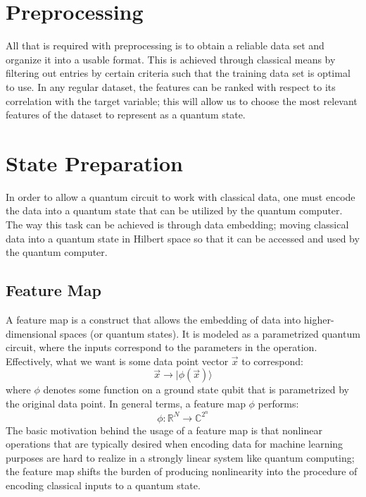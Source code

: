 \documentclass[12pt]{article}
\begin{document}
\section{Preprocessing}
    All that is required with preprocessing is to obtain a reliable data set 
    and organize it into a usable format. This is achieved through classical means by 
    filtering out entries by certain criteria such that the training data set is optimal 
    to use. In any regular dataset, the features can be ranked with respect to its correlation with the target
    variable; this will allow us to choose the most relevant features of the dataset to represent as a quantum state.

\section{State Preparation}
    In order to allow a quantum circuit to work with classical data, one must encode the data into a 
    quantum state that can be utilized by the quantum computer. The way this task can be achieved is through data embedding; moving classical 
    data into a quantum state in Hilbert space so that it can be accessed and used by the quantum computer.

    \subsection{Feature Map}
        A feature map is a construct that allows the embedding of data into higher-dimensional spaces (or quantum states). 
        It is modeled as a parametrized quantum circuit, where the inputs correspond to the parameters in the operation. 
        Effectively, what we want is some data point vector $\overrightarrow{x}$ to correspond:
        \[\overrightarrow{x} \to |\phi(\overrightarrow{x})\rangle\]
        where $\phi$ denotes some function on a ground state qubit that is parametrized by the original data point.
        In general terms, a feature map $\phi$ performs:
        \[\phi: \mathbb{R}^N \to \mathbb{C}^{2^n}\]
        The basic motivation behind the usage of a feature map is that nonlinear operations that are typically desired when encoding 
        data for machine learning purposes are hard to realize in a strongly linear system like quantum computing; the feature map shifts the burden of 
        producing nonlinearity into the procedure of encoding classical inputs to a quantum state. 
\end{document}
